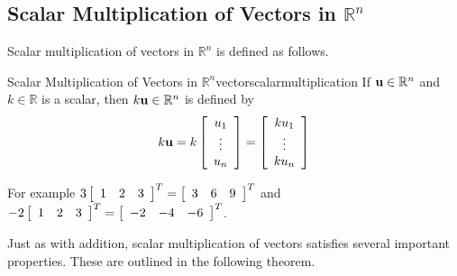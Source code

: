 \subsection{Scalar Multiplication of Vectors in \texorpdfstring{$\mathbb{R}^n$}{Rn}}

Scalar multiplication of vectors in $\mathbb{R}^n$ is defined as 
follows.

\begin{definition}{Scalar Multiplication of Vectors in $\mathbb{R}^n$}{vectorscalarmultiplication}
If ${\bf u}\in \mathbb{R}^{n}$ and $k\in \mathbb{R}$ is a
scalar,
 then $k{\bf u}\in \mathbb{R}^{n}$ is defined by
\begin{equation*}
k{\bf u}=k\left[ \begin{array}{c}
u_{1} \\
\vdots \\
u_{n}
\end{array}
\right] = \left[ \begin{array}{c}
ku_{1} \\
\vdots \\
ku_{n}
\end{array}
\right]
\end{equation*}
\end{definition}

For example 
$3 \left[
\begin{array}{rrr}
1 & 2 & 3
\end{array}
\right]^T =
\left[
\begin{array}{rrr}
3 & 6 & 9
\end{array}
\right]^T$
 and 
$-2\left[
\begin{array}{rrr}
1 & 2 & 3
\end{array}
\right]^T
=
\left[
\begin{array}{rrr}
-2 & -4 & -6
\end{array}
\right]^T$.

Just as with addition, scalar multiplication of vectors satisfies several important properties. These are 
outlined in the following theorem. 

